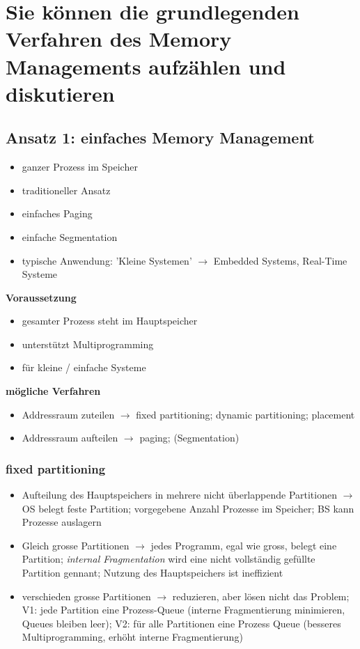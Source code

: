 \documentclass{report}
\theoremstyle{definition}
\theoremstyle{example}
\begin{document}
\section{Sie können die grundlegenden Verfahren des Memory Managements aufzählen und diskutieren}

	\subsection{Ansatz 1: einfaches Memory Management}
\begin{itemize}
	\item ganzer Prozess im Speicher
	\item traditioneller Ansatz
	\item einfaches Paging
	\item einfache Segmentation
	\item typische Anwendung: 'Kleine Systemen' $\rightarrow$ Embedded Systems, Real-Time Systeme
\end{itemize}

\textbf{Voraussetzung}
\begin{itemize}
	\item gesamter Prozess steht im Hauptspeicher
	\item unterstützt Multiprogramming
	\item für kleine / einfache Systeme
\end{itemize}

\textbf{mögliche Verfahren}
\begin{itemize}
	\item Addressraum zuteilen $\rightarrow$ fixed partitioning; dynamic partitioning; placement
	\item Addressraum aufteilen $\rightarrow$ paging; (Segmentation)
\end{itemize}
		
		\subsubsection{fixed partitioning}

\begin{itemize}
	\item Aufteilung des Hauptspeichers in mehrere nicht überlappende Partitionen $\rightarrow$ OS belegt feste Partition; vorgegebene Anzahl Prozesse im Speicher; BS kann Prozesse auslagern
	\item Gleich grosse Partitionen $\rightarrow$ jedes Programm, egal wie gross, belegt eine Partition; \textit{internal Fragmentation} wird eine nicht vollständig gefüllte Partition gennant; Nutzung des Hauptspeichers ist ineffizient
	\item verschieden grosse Partitionen $\rightarrow$ reduzieren, aber lösen nicht das Problem; V1: jede Partition eine Prozess-Queue (interne Fragmentierung minimieren, Queues bleiben leer); V2: für alle Partitionen eine Prozess Queue (besseres Multiprogramming, erhöht interne Fragmentierung) 
\end{itemize}
\end{document}
